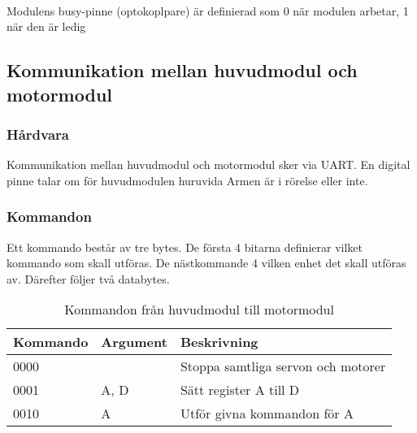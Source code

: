  \\

Modulens busy-pinne (optokoplpare) är definierad som 0 när modulen arbetar, 1 när den är ledig

\subsection{Kommunikation mellan huvudmodul och motormodul} \label{protokoll:pc-motor}

\subsubsection{Hårdvara}
Kommunikation mellan huvudmodul och motormodul sker via UART. En digital pinne talar om för huvudmodulen huruvida Armen är i rörelse eller inte.

\subsubsection{Kommandon}
Ett kommando består av tre bytes. De första 4 bitarna definierar vilket kommando som skall utföras. De nästkommande 4 vilken enhet det skall utföras av. Därefter följer två databytes. 

\begin{table}[h]
	\centering
		\begin{tabularx}{\textwidth}{| l | l | X |}
			\hline
			\textbf{Kommando} & \textbf{Argument} & \textbf{Beskrivning} \\
			\hline
			{0000} & {} & {Stoppa samtliga servon och motorer} \\
			\hline
			{0001} & {A, D} & {Sätt register A till D} \\
			\hline
			{0010} & {A} & {Utför givna kommandon för A} \\
			\hline
		\end{tabularx}
	\caption{Kommandon från huvudmodul till motormodul} \label{protokoll:pc-motor-tabell}
\end{table}

